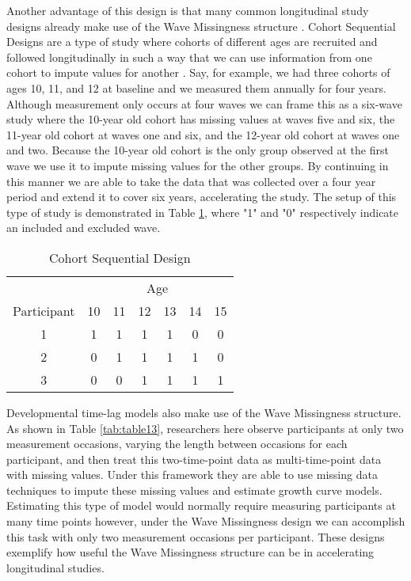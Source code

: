 \documentclass{svjour3}                     %
\begin{document}
Another advantage of this design is that many common longitudinal study designs already make use of the Wave Missingness structure \citep{little2013planned}. Cohort Sequential Designs are a type of study where cohorts of different ages are recruited and followed longitudinally in such a way that we can use information from one cohort to impute values for another \citep{little2013longitudinal, duncan2013introduction}. Say, for example, we had three cohorts of ages 10, 11, and 12 at baseline and we measured them annually for four years. Although measurement only occurs at four waves we can frame this as a six-wave study where the 10-year old cohort has missing values at waves five and six, the 11-year old cohort at waves one and six, and the 12-year old cohort at waves one and two. Because the 10-year old cohort is the only group observed at the first wave we use it to impute missing values for the other groups. By continuing in this manner we are able to take the data that was collected over a four year period and extend it to cover six years, accelerating the study. The setup of this type of study is demonstrated in Table \ref{tab:table12}, where "1" and "0" respectively indicate an included and excluded wave. \par

\begin{table}[t!]
	\centering
	\caption{Cohort Sequential Design}
	\label{tab:table12}
	\setlength{\tabcolsep}{0.5cm}
	\begin{tabular}{c|cccccc}
		\toprule
		& \multicolumn{6}{c}{Age} \\
		Participant & 10 & 11 & 12 & 13 & 14 & 15 \\
		\midrule
		1 & 1 & 1 & 1 & 1 & 0 & 0\\
		2 & 0 & 1 & 1 & 1 & 1 & 0\\
		3 & 0 & 0 & 1 & 1 & 1 & 1\\
		\bottomrule
	\end{tabular}
\end{table}

Developmental time-lag models \citep{mcardle1997expanding} also make use of the Wave Missingness structure. As shown in Table \ref{tab:table13}, researchers here observe participants at only two measurement occasions, varying the length between occasions for each participant, and then treat this two-time-point data as multi-time-point data with missing values. Under this framework they are able to use missing data techniques to impute these missing values and estimate growth curve models. Estimating this type of model would normally require measuring participants at many time points however, under the Wave Missingness design we can accomplish this task with only two measurement occasions per participant. These designs exemplify how useful the Wave Missingness structure can be in accelerating longitudinal studies. \par
\end{document}

